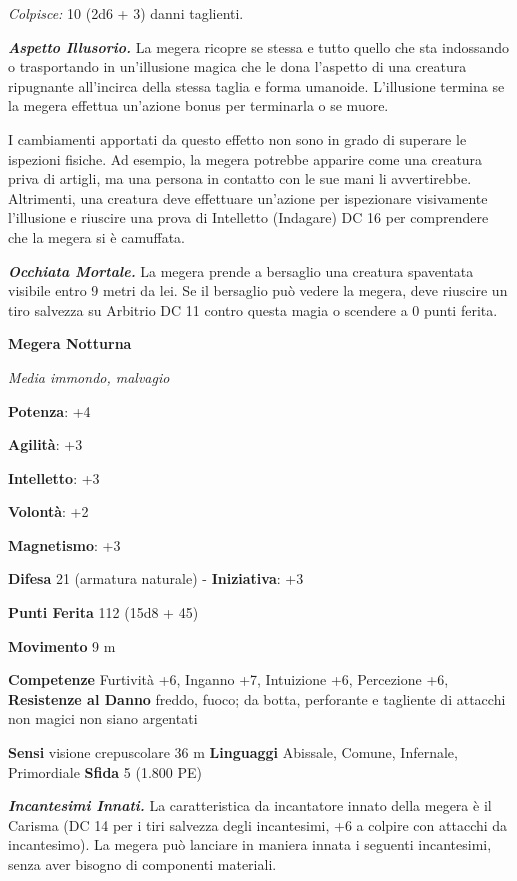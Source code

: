 \begin{multicols}{2}
\emph{Colpisce:} 10 (2d6 + 3) danni taglienti.

\emph{\textbf{Aspetto Illusorio.}} La megera ricopre se stessa e tutto
quello che sta indossando o trasportando in un'illusione magica che le
dona l'aspetto di una creatura ripugnante all'incirca della stessa
taglia e forma umanoide. L'illusione termina se la megera effettua
un'azione bonus per terminarla o se muore.

I cambiamenti apportati da questo effetto non sono in grado di superare
le ispezioni fisiche. Ad esempio, la megera potrebbe apparire come una
creatura priva di artigli, ma una persona in contatto con le sue mani li
avvertirebbe. Altrimenti, una creatura deve effettuare un'azione per
ispezionare visivamente l'illusione e riuscire una prova di Intelletto
(Indagare) DC 16 per comprendere che la megera si è camuffata.

\emph{\textbf{Occhiata Mortale.}} La megera prende a bersaglio una
creatura spaventata visibile entro 9 metri da lei. Se il bersaglio può
vedere la megera, deve riuscire un tiro salvezza su Arbitrio DC 11
contro questa magia o scendere a 0 punti ferita.

\textbf{Megera Notturna}

\emph{Media immondo, malvagio}

\textbf{Potenza}: +4

\textbf{Agilità}: +3

\textbf{Intelletto}: +3

\textbf{Volontà}: +2

\textbf{Magnetismo}: +3

\textbf{Difesa} 21 (armatura naturale) - \textbf{Iniziativa}: +3

\textbf{Punti Ferita} 112 (15d8 + 45)

\textbf{Movimento} 9 m

\textbf{Competenze} Furtività +6, Inganno +7, Intuizione +6, Percezione +6,
\textbf{Resistenze al Danno} freddo, fuoco; da botta, perforante e
tagliente di attacchi non magici non siano argentati

\textbf{Sensi} visione crepuscolare 36 m
\textbf{Linguaggi} Abissale, Comune, Infernale, Primordiale
\textbf{Sfida} 5 (1.800 PE)\smallskip

\emph{\textbf{Incantesimi Innati.}} La caratteristica da incantatore
innato della megera è il Carisma (DC 14 per i tiri salvezza degli
incantesimi, +6 a colpire con attacchi da incantesimo). La megera può
lanciare in maniera innata i seguenti incantesimi, senza aver bisogno di
componenti materiali.


\end{multicols}

